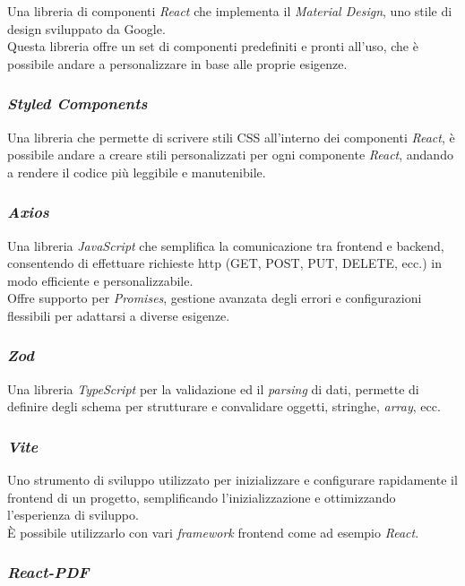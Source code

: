 Una libreria di componenti \textit{React} che implementa il \textit{Material Design}, uno stile di design sviluppato da Google.\\
Questa libreria offre un set di componenti predefiniti e pronti all’uso, che è possibile andare a personalizzare in base alle proprie esigenze.

\subsubsection{\textit{Styled Components}}

Una libreria che permette di scrivere stili CSS all’interno dei componenti \textit{React}, è possibile andare a creare stili personalizzati per ogni componente \textit{React}, andando a rendere il codice più leggibile e manutenibile.

\subsubsection{\textit{Axios}}

Una libreria \textit{JavaScript} che semplifica la comunicazione tra frontend e backend, consentendo di effettuare richieste \gls{http} (GET, POST, PUT, DELETE, ecc.) in modo efficiente e personalizzabile. \\
Offre supporto per \textit{Promises}, gestione avanzata degli errori e configurazioni flessibili per adattarsi a diverse esigenze.

\subsubsection{\textit{Zod}}

Una libreria \textit{TypeScript} per la validazione ed il \textit{parsing} di dati, permette di definire degli schema per strutturare e convalidare oggetti, stringhe, \textit{array}, ecc.

\subsubsection{\textit{Vite}}

Uno strumento di sviluppo utilizzato per inizializzare e configurare rapidamente il \gls{frontend} di un progetto, semplificando l'inizializzazione e ottimizzando l'esperienza di sviluppo.\\
È possibile utilizzarlo con vari \textit{framework} \gls{frontend} come ad esempio \textit{React}.

\subsubsection{\textit{React-PDF}}

